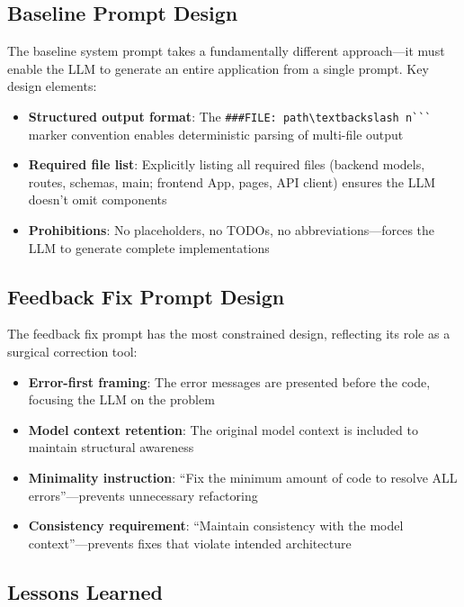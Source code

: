 \documentclass[11pt,a4paper]{article}
\begin{document}
{\subsection{Baseline Prompt Design}

The baseline system prompt takes a fundamentally different approach---it must enable the LLM to generate an entire application from a single prompt. Key design elements:

\begin{itemize}
    \item \textbf{Structured output format}: The {\lstinline|###FILE: path\textbackslash n```|} marker convention enables deterministic parsing of multi-file output
    \item \textbf{Required file list}: Explicitly listing all required files (backend models, routes, schemas, main; frontend App, pages, API client) ensures the LLM doesn't omit components
    \item \textbf{Prohibitions}: No placeholders, no TODOs, no abbreviations---forces the LLM to generate complete implementations
\end{itemize}

\subsection{Feedback Fix Prompt Design}

The feedback fix prompt has the most constrained design, reflecting its role as a surgical correction tool:

\begin{itemize}
    \item \textbf{Error-first framing}: The error messages are presented before the code, focusing the LLM on the problem
    \item \textbf{Model context retention}: The original model context is included to maintain structural awareness
    \item \textbf{Minimality instruction}: ``Fix the minimum amount of code to resolve ALL errors''---prevents unnecessary refactoring
    \item \textbf{Consistency requirement}: ``Maintain consistency with the model context''---prevents fixes that violate intended architecture
\end{itemize}

\subsection{Lessons Learned}

}
\end{document}
